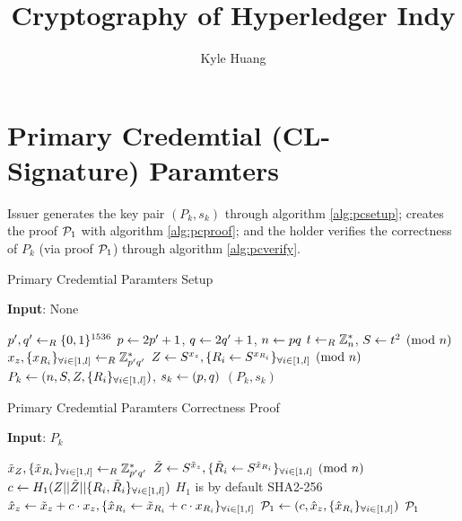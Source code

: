 \documentclass{article}
\begin{document}
\title{Cryptography of Hyperledger Indy}
\author{Kyle Huang}
\maketitle

\section{Primary Credemtial (CL-Signature) Paramters}
Issuer generates the key pair $(P_{k}, s_{k})$ through algorithm \ref{alg:pcsetup}; creates the proof $\mathcal{P}_{1}$ with algorithm \ref{alg:pcproof}; and the holder verifies the correctness of $P_{k}$ (via proof $\mathcal{P}_{1}$) through algorithm \ref{alg:pcverify}.

\begin{algorithm}
\caption{Primary Credemtial Paramters Setup}
\label{alg:pcsetup}
\hspace*{\algorithmicindent} \textbf{Input}: None
\begin{algorithmic}
	\State $p',q'\leftarrow _{R} \{0, 1\}^{1536}$
	\State $p\leftarrow 2p'+1$, $q\leftarrow 2q'+1$, $n\leftarrow pq$
	\State $t\leftarrow _{R} \mathbb{Z}_{n}^{*}$, $S\leftarrow t^2\pmod{n}$
	\State $x_{z}, \{x_{R_i}\}_{\forall i\in [1,l]} \leftarrow _{R} \mathbb{Z}_{p'q'}^{*}$
	\State $Z\leftarrow S^{x_{z}}, \{R_{i}\leftarrow S^{x_{R_{i}}}\}_{\forall i\in [1,l]}\pmod{n}$
	\State $P_k\leftarrow (n, S, Z, \{R_i\}_{\forall i\in [1,l]})$, $s_k\leftarrow(p,q)$
	\State \Return $(P_{k}, s_{k})$
\end{algorithmic}
\end{algorithm}


\begin{algorithm}
\caption{Primary Credemtial Paramters Correctness Proof}
\label{alg:pcproof}
\hspace*{\algorithmicindent} \textbf{Input}: $P_{k}$
\begin{algorithmic}
	\State $\tilde{x}_Z,\{\tilde{x}_{R_{i}}\}_{\forall i\in [1,l]}\leftarrow _{R} \mathbb{Z}_{p'q'}^{*}$
	\State $\tilde{Z}\leftarrow S^{\tilde{x}_{z}}, \{\tilde{R}_i\leftarrow S^{\tilde{x}_{R_{i}}}\}_{\forall i\in [1,l]}\pmod{n}$
	\State $c\leftarrow H_{1}(Z||\tilde{Z}||\{R_i,\tilde{R}_i\}_{\forall i\in [1,l]})$
	\Comment $H_1$ is by default SHA2-256
	\State $\hat{x}_{z}\leftarrow \tilde{x}_{z} + c\cdot x_{z}, \{\hat{x}_{R_{i}}\leftarrow \tilde{x}_{R_{i}} + c\cdot x_{R_{i}}\}_{\forall i\in [1,l]}$
	\State $\mathcal{P}_{1}\leftarrow (c, \hat{x}_{z}, \{ \hat{x}_{R_{i}}\}_{\forall i\in [1,l]})$
	\State \Return $\mathcal{P}_{1}$
\end{algorithmic}
\end{algorithm}
\end{document}

